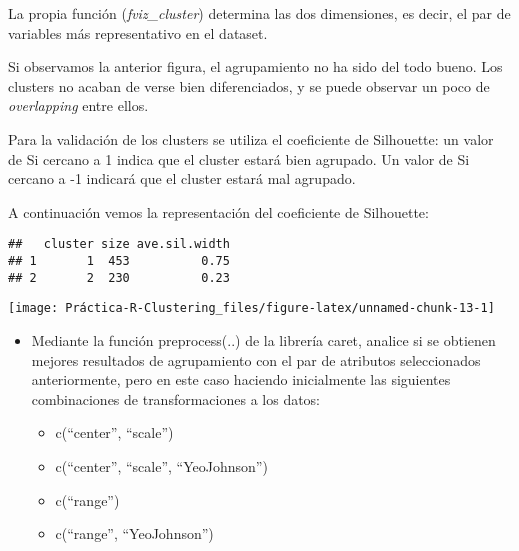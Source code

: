 \documentclass[
]{article}
\newenvironment{Shaded}{\begin{snugshade}}{\end{snugshade}}
\newcommand{\CommentTok}[1]{\textcolor[rgb]{0.56,0.35,0.01}{\textit{#1}}}
\newcommand{\KeywordTok}[1]{\textcolor[rgb]{0.13,0.29,0.53}{\textbf{#1}}}
\newcommand{\NormalTok}[1]{#1}
\newcommand{\OperatorTok}[1]{\textcolor[rgb]{0.81,0.36,0.00}{\textbf{#1}}}
\newcommand{\StringTok}[1]{\textcolor[rgb]{0.31,0.60,0.02}{#1}}
\providecommand{\tightlist}{%
  \setlength{\itemsep}{0pt}\setlength{\parskip}{0pt}}
\begin{document}
La propia función (\emph{fviz\_cluster}) determina las dos dimensiones,
es decir, el par de variables más representativo en el dataset.

Si observamos la anterior figura, el agrupamiento no ha sido del todo
bueno. Los clusters no acaban de verse bien diferenciados, y se puede
observar un poco de \emph{overlapping} entre ellos.

Para la validación de los clusters se utiliza el coeficiente de
Silhouette: un valor de Si cercano a 1 indica que el cluster estará bien
agrupado. Un valor de Si cercano a -1 indicará que el cluster estará mal
agrupado.

A continuación vemos la representación del coeficiente de Silhouette:

\begin{Shaded}
\end{Shaded}

\begin{verbatim}
##   cluster size ave.sil.width
## 1       1  453          0.75
## 2       2  230          0.23
\end{verbatim}

\begin{center}\texttt{[image: Práctica-R-Clustering\_files/figure-latex/unnamed-chunk-13-1]} \end{center}

\begin{itemize}
\item
  Mediante la función preprocess(..) de la librería caret, analice si se
  obtienen mejores resultados de agrupamiento con el par de atributos
  seleccionados anteriormente, pero en este caso haciendo inicialmente
  las siguientes combinaciones de transformaciones a los datos:

  \begin{itemize}
  \tightlist
  \item
    c(``center'', ``scale'')
  \item
    c(``center'', ``scale'', ``YeoJohnson'')
  \item
    c(``range'')
  \item
    c(``range'', ``YeoJohnson'')
  \end{itemize}
\end{itemize}
\end{document}
